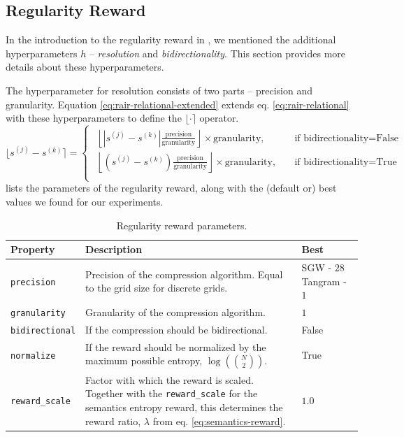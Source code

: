 \newpage
\subsection{Regularity Reward}
\label{sec:regularity-reward-details}

In the introduction to the regularity reward in , we mentioned the additional hyperparameters \(h\) -- \emph{resolution} and \emph{bidirectionality}.
This section provides more details about these hyperparameters.

The hyperparameter for resolution consists of two parts -- precision and granularity.
Equation \eqref{eq:rair-relational-extended} extends eq. \eqref{eq:rair-relational} with these hyperparameters to define the \(\lfloor \cdot \rceil\) operator.
\begin{equation}
    \lfloor s^{(j)} - s^{(k)} \rceil = \begin{cases}\begin{aligned}
        \left\lfloor \left| s^{(j)} - s^{(k)} \right| \frac{\text{precision}}{\text{granularity}} \right\rfloor \times \text{granularity},\quad&\text{if bidirectionality} = \text{False}\\
        \left\lfloor \left( s^{(j)} - s^{(k)} \right) \frac{\text{precision}}{\text{granularity}} \right\rfloor \times \text{granularity},\quad&\text{if bidirectionality} = \text{True}\\
    \end{aligned}\end{cases}
    \label{eq:rair-relational-extended}
\end{equation}
 lists the parameters of the regularity reward, along with the (default or) best values we found for our experiments.
\begin{table}[H]
    \centering
    \caption{Regularity reward parameters.}
    \begin{tabularx}{\textwidth}{C{3.9cm} L C{2cm}}
        \hline
        Property & Description & Best\\
        \hline
        \texttt{precision} & Precision of the compression algorithm. Equal to the grid size for discrete grids. & SGW - \(28\) Tangram - \(1\)\\
        \texttt{granularity} & Granularity of the compression algorithm. & \(1\)\\
        \texttt{bidirectional} & If the compression should be bidirectional. & False\\
        \texttt{normalize} & If the reward should be normalized by the maximum possible entropy, \(\log\left(\binom{N}{2}\right)\). & True\\
        \texttt{reward\_scale} & Factor with which the reward is scaled. Together with the \texttt{reward\_scale} for the semantics entropy reward, this determines the reward ratio, \(\lambda\) from eq. \eqref{eq:semantics-reward}. & \(1.0\)\\
        \hline
    \end{tabularx}
    \label{tab:regularity-reward-params}
\end{table}


